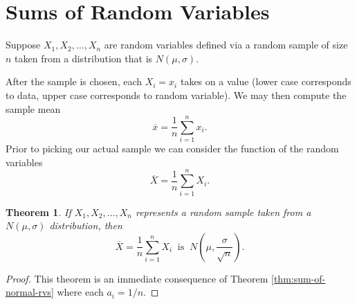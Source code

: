 \documentclass[
]{book}
\newtheorem{theorem}{Theorem}[chapter]
\theoremstyle{definition}
\theoremstyle{definition}
\theoremstyle{definition}
\theoremstyle{definition}
\theoremstyle{remark}
\begin{document}
\section{Sums of Random Variables}\label{sums-of-random-variables}

Suppose \(X_1, X_2, \ldots, X_n\) are random variables defined via a random sample of size \(n\) taken from a distribution that is \(N(\mu,\sigma)\).

After the sample is chosen, each \(X_i = x_i\) takes on a value (lower case corresponds to data, upper case corresponds to random variable).
We may then compute the sample mean \[\overline{x} = \frac{1}{n}\sum_{i=1}^n x_i.\]
Prior to picking our actual sample we can consider the function of the random variables \[\overline{X} = \frac{1}{n} \sum_{i=1}^n X_i.\]

\begin{theorem}
\protect\hypertarget{thm:normal-random-sample}{}\label{thm:normal-random-sample}If \(X_1, X_2, \ldots, X_n\) represents a random sample taken from a \(N(\mu,\sigma)\) distribution, then \[\overline{X} = \frac{1}{n} \sum_{i=1}^n X_i ~\text{ is }~ N\left(\mu,\frac{\sigma}{\sqrt{n}}\right).\]
\end{theorem}

\begin{proof}
This theorem is an immediate consequence of Theorem \ref{thm:sum-of-normal-rvs} where each \(a_i = 1/n\).
\end{proof}
\end{document}

